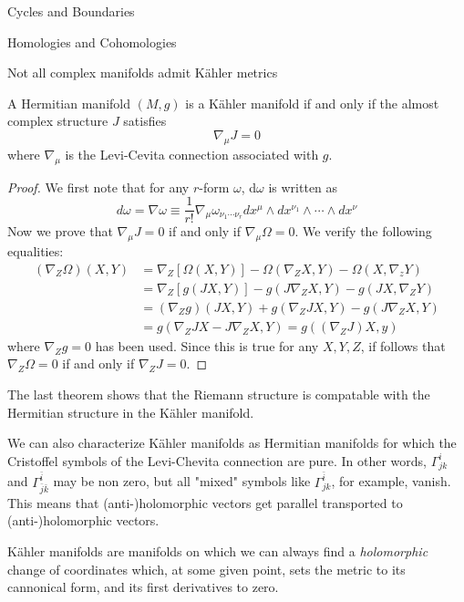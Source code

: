 \begin{subsubsection}{Cycles and Boundaries}
\begin{subsubsection}{Homologies and Cohomologies}
\begin{remark}
Not all complex manifolds admit K\"ahler metrics
\end{remark}

\begin{theorem}
A Hermitian manifold $(M,g)$ is a K\"ahler manifold if and only if the almost
  complex structure $J$ satisfies
\begin{equation}
\nabla_\mu J = 0
\end{equation}
where $\nabla_\mu$ is the Levi-Cevita connection associated with $g$.
\end{theorem}

\begin{proof}
We first note that for any $r$-form $\omega$, d$\omega$ is written as
\begin{equation}
  d\omega = \nabla\omega \equiv
  \frac{1}{r!}\nabla_\mu\omega_{\nu_1\cdots\nu_r}dx^\mu\wedge
  dx^{\nu_1}\wedge\cdots\wedge dx^{\nu}    
\end{equation}
Now we prove that $\nabla_\mu J = 0$ if and only if $\nabla_\mu\Omega = 0$. We
verify the following equalities:
\begin{align}
(\nabla_Z\Omega)(X,Y)
  &= \nabla_Z\left[\Omega(X,Y)\right]-\Omega(\nabla_ZX,Y)-\Omega(X,\nabla_z Y)\\
  &= \nabla_Z\left[g(JX,Y)\right] - g(J\nabla_Z X,Y) - g(JX, \nabla_Z Y)\\
  &= (\nabla_Z g)(JX,Y) + g(\nabla_ZJX,Y) - g(J\nabla_ZX,Y)\\
  &= g(\nabla_ZJX-J\nabla_ZX,Y) = g((\nabla_ZJ)X,y)
\end{align}
where $\nabla_Z g = 0$ has been used. Since this is true for any $X,Y,Z$, if
  follows that $\nabla_Z\Omega = 0$ if and only if $\nabla_Z J = 0$.
\end{proof}
The last theorem shows that the Riemann structure is compatable with the
Hermitian structure in the K\"ahler manifold.

We can also characterize K\"ahler manifolds as Hermitian manifolds for which
the Cristoffel symbols of the Levi-Chevita connection are pure. In other words,
$\Gamma_{jk}^i$ and $\Gamma_{\bar{j}\bar{k}}^{\bar{i}}$ may be non zero, but
all "mixed" symbols like $\Gamma_{jk}^{\bar{i}}$, for example, vanish. This
means that (anti-)holomorphic vectors get parallel transported to
(anti-)holomorphic vectors.

K\"ahler manifolds are manifolds on which we can always find
a \textit{holomorphic} change of coordinates which, at some given point, sets
the metric to its cannonical form, and its first derivatives to zero.


\end{subsubsection}
\end{subsubsection}
